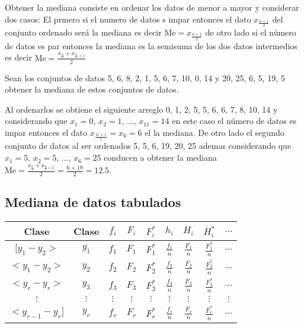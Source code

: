 \documentclass[10pt,]{krantz}
\theoremstyle{definition}
\theoremstyle{definition}
\theoremstyle{definition}
\theoremstyle{remark}
\let\BeginKnitrBlock\begin \let\EndKnitrBlock\end
\begin{document}
Obtener la mediana consiste en ordenar los datos de menor a mayor y considerar dos casos: El prmero si el numero de datos s impar entonces el dato \(x_{\frac{n+1}{2}}\) del conjunto ordenado será la mediana es decir \(\text{Me}=x_{\frac{n+1}{2}}\) de otro lado si el número de datos es par entonces la mediana es la semisuma de los dos datos intermedios es decir \(\text{Me}=\frac{x_{\frac{n}{2}}+x_{\frac{n}{2}+1}}{2}\)

\BeginKnitrBlock{exercise}
\protect\hypertarget{exr:unnamed-chunk-5}{}{\label{exr:unnamed-chunk-5} }Sean los conjuntos de datos 5, 6, 8, 2, 1, 5, 6, 7, 10, 0, 14 y 20, 25, 6, 5, 19, 5 obtener la mediana de estos conjuntos de datos.
\EndKnitrBlock{exercise}

\BeginKnitrBlock{solution}
\iffalse{} {Solución. } \fi{}Al ordenarlos se obtiene el siguiente arreglo 0, 1, 2, 5, 5, 6, 6, 7, 8, 10, 14 y considerando que \(x_1=0\), \(x_2=1\), \(\ldots\), \(x_{11}=14\) en este caso el número de datos es impar entonces el dato \(x_{\frac{11+1}{2}}=x_{6}=6\) el la mediana. De otro lado el segundo conjunto de datos al ser ordenados 5, 5, 6, 19, 20, 25 ademas considerando que \(x_1=5\), \(x_2=5\), \(\ldots\), \(x_6=25\) conducen a obtener la mediana \(\text{Me}=\frac{x_{\frac{6}{2}}+x_{\frac{6}{2}+1}}{2}=\frac{6+19}{2}=12.5\).
\EndKnitrBlock{solution}

\hypertarget{mediana-de-datos-tabulados}{%
\subsection{Mediana de datos tabulados}\label{mediana-de-datos-tabulados}}

\begin{longtable}[]{@{}ccccccccc@{}}
\toprule
Clase & Clase & \(f_i\) & \(F_i\) & \(F_i^*\) & \(h_i\) & \(H_i\) & \(H_i^*\) & \(\ldots\)\tabularnewline
\midrule
\endhead
\([y_1-y_2>\) & \(y_1\) & \(f_1\) & \(F_1\) & \(F_1^*\) & \(\frac{f_1}{n}\) & \(\frac{F_1}{n}\) & \(\frac{F_1^*}{n}\) & \(\ldots\)\tabularnewline
\(<y_1-y_2>\) & \(y_2\) & \(f_2\) & \(F_2\) & \(F_2^*\) & \(\frac{f_2}{n}\) & \(\frac{F_2}{n}\) & \(\frac{F_2^*}{n}\) & \(\ldots\)\tabularnewline
\(<y_{r}-y_r>\) & \(y_3\) & \(f_3\) & \(F_3\) & \(F_3^*\) & \(\frac{f_3}{n}\) & \(\frac{F_3}{n}\) & \(\frac{F_3^*}{n}\) & \(\ldots\)\tabularnewline
\(\vdots\) & \(\vdots\) & \(\vdots\) & \(\vdots\) & \(\vdots\) & \(\vdots\) & \(\vdots\) & \(\vdots\) & \(\vdots\)\tabularnewline
\(<y_{r-1}-y_r]\) & \(y_r\) & \(f_r\) & \(F_r\) & \(F_r^*\) & \(\frac{f_r}{n}\) & \(\frac{F_r}{n}\) & \(\frac{F_r^*}{n}\) & \(...\)\tabularnewline
\bottomrule
\end{longtable}
\end{document}
